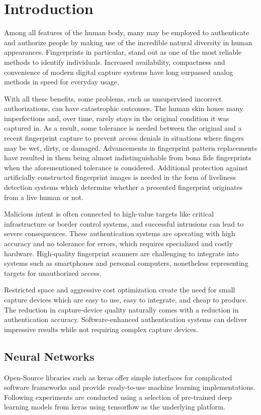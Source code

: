 \section{Introduction}
Among all features of the human body, many may be employed to authenticate and authorize people by making use of the incredible natural diversity in human appearances. 
Fingerprints in particular, stand out as one of the most reliable methods to identify individuals.
Increased availability, compactness and convenience of modern digital capture systems have long surpassed analog methods in speed for everyday usage.

With all these benefits, some problems, such as unsupervised incorrect authorizations, can have catastrophic outcomes.
The human skin hones many imperfections and, over time, rarely stays in the original condition it was captured in.
As a result, some tolerance is needed between the original and a recent fingerprint capture to prevent access denials in situations where fingers may be wet, dirty, or damaged.
Advancements in fingerprint pattern replacements have resulted in them being almost indistinguishable from bona fide fingerprints when the aforementioned tolerance is considered.
Additional protection against artificially constructed fingerprint images is needed in the form of liveliness detection systems which determine whether a presented fingerprint originates from a live human or not.

Malicious intent is often connected to high-value targets like critical infrastructure or border control systems, and successful intrusions can lead to severe consequences.
These authentication systems are operating with high accuracy and no tolerance for errors, which requires specialized and costly hardware.
High-quality fingerprint scanners are challenging to integrate into systems such as smartphones and personal computers, nonetheless representing targets for unauthorized access.

Restricted space and aggressive cost optimization create the need for small capture devices which are easy to use, easy to integrate, and cheap to produce. 
The reduction in capture-device quality naturally comes with a reduction in authentication accuracy.
Software-enhanced authentication systems can deliver impressive results while not requiring complex capture devices.



\subsection{Neural Networks}
Open-Source libraries such as \gls{keras} offer simple interfaces for complicated software frameworks and provide ready-to-use machine learning implementations.
Following experiments are conducted using a selection of pre-trained deep learning models from \gls{keras} using \gls{tensorflow} as the underlying platform.


